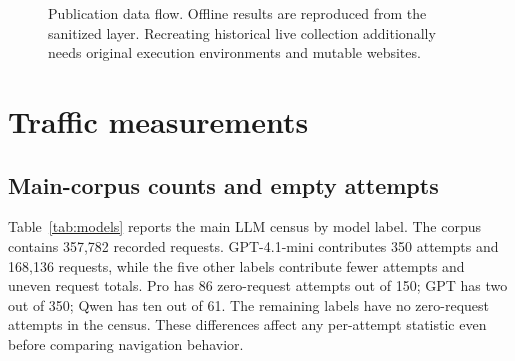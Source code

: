 \documentclass[10pt,sigconf,nonacm]{acmart}
\begin{document}
\begin{figure}[t]
\centering
{}
\caption{Publication data flow. Offline results are reproduced from the sanitized layer. Recreating historical live collection additionally needs original execution environments and mutable websites.}
\label{fig:pipeline}
\end{figure}

\section{Traffic measurements}
\label{sec:traffic}
\subsection{Main-corpus counts and empty attempts}
Table~\ref{tab:models} reports the main LLM census by model label. The corpus contains 357{,}782 recorded requests. GPT-4.1-mini contributes 350 attempts and 168{,}136 requests, while the five other labels contribute fewer attempts and uneven request totals. Pro has 86 zero-request attempts out of 150; GPT has two out of 350; Qwen has ten out of 61. The remaining labels have no zero-request attempts in the census. These differences affect any per-attempt statistic even before comparing navigation behavior.

\begin{table}[t]
\centering\small
\caption{Main LLM corpus from the sanitized census. Empty attempts remain in the denominator for requests per attempt. Positive sessions have at least one emitted trace record.}
\label{tab:models}

\end{table}
\end{document}
